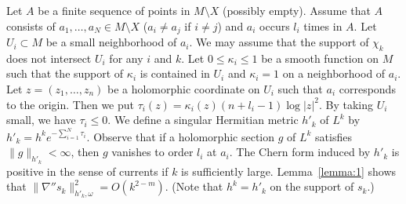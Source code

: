 \documentclass[12pt,oneside]{amsart}
\theoremstyle{plain}
\theoremstyle{definition}
\theoremstyle{remark}
\begin{document}
Let $A$ be a finite sequence of points in $M \setminus X$ (possibly empty).  
Assume that $A$ consists of $a_1, \ldots, a_N \in M \setminus X$ ($a_i \neq a_j$ if $i \neq j$) and $a_i$ occurs $l_i$ times in $A$.  
Let $U_{i} \subset M$ be a small neighborhood of $a_i$.  
We may assume that the support of $\chi_{k}$ does not intersect $U_{i}$ for any $i$ and $k$.  
Let $0 \leq \kappa_i \leq 1$ be a smooth function on $M$ such that the support of $\kappa_i$ is contained in $U_i$ and $\kappa_i = 1$ on a neighborhood of $a_i$.  
Let $z = (z_1, \ldots, z_n)$ be a holomorphic coordinate on $U_i$ such that $a_i$ corresponds to the origin. 
Then we put $\tau_{i}(z) = \kappa_i (z) (n+l_i-1)\log |z|^2$.  
By taking $U_i$ small, we have $\tau_{i} \leq 0$.  
We define a singular Hermitian metric $h'_{k}$ of $L^k$ by $h'_{k} = h^k e^{-\sum_{i=1}^{N} \tau_{i}}$.  
%
Observe that if a holomorphic section $g$ of $L^k$ satisfies $\|g\|_{h'_{k}} < \infty$, then $g$ vanishes to order $l_i$ at $a_i$.   
The Chern form induced by $h'_{k}$ is positive in the sense of currents if $k$ is sufficiently large.  
Lemma~\ref{lemma:1} shows that $\| \nabla'' s_{k}\|^2_{h'_{k}, \omega} = O(k^{2-m})$.  
(Note that $h^k = h'_{k}$ on the support of $s_k$.)
\end{document}
